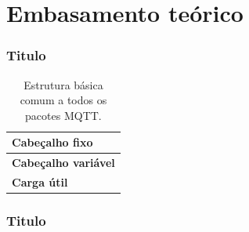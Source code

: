 \documentclass[12pt]{beamer}
\begin{document}
\section{Embasamento teórico}\label{Embasamento teórico}

\begin{frame}
    \frametitle{Titulo}

    \begin{table}[h!]\caption{Estrutura básica comum a todos os pacotes MQTT.}
        \centering
        \begin{tabular}{|l|}
            \hline
            \textbf{Cabeçalho fixo}     \\ \hline
            \textbf{Cabeçalho variável} \\ \hline
            \textbf{Carga útil}         \\ \hline
        \end{tabular}
    \end{table}
\end{frame}

\begin{frame}
    \frametitle{Titulo}
    \begin{table}[h!]\caption{Estrutura do cabeçalho fixo utilizado no protocolo MQTT.}
        \centering
    \end{table}
\end{frame}
\end{document}
